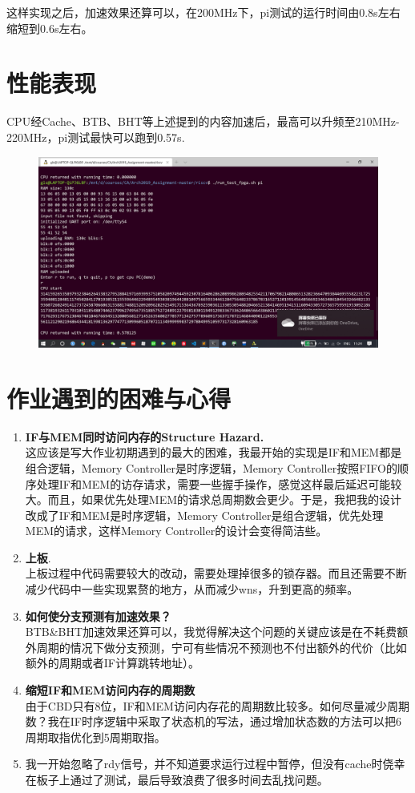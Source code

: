 \documentclass[a4paper,UTF8]{article}
\begin{document}
这样实现之后，加速效果还算可以，在200MHz下，pi测试的运行时间由0.8s左右缩短到0.6s左右。
\newpage
\section{性能表现}
CPU经Cache、BTB、BHT等上述提到的内容加速后，最高可以升频至210MHz-220MHz，pi测试最快可以跑到0.57s.
\begin{figure}[h]
    \centering
	\includegraphics[width=1\linewidth]{5.png}
\end{figure}

\section{作业遇到的困难与心得}
\begin{enumerate}
    \item \textbf{IF与MEM同时访问内存的Structure Hazard.}\\
        这应该是写大作业初期遇到的最大的困难，我最开始的实现是IF和MEM都是组合逻辑，Memory Controller是时序逻辑，Memory Controller按照FIFO的顺序处理IF和MEM的访存请求，需要一些握手操作，感觉这样最后延迟可能较大。而且，如果优先处理MEM的请求总周期数会更少。于是，我把我的设计改成了IF和MEM是时序逻辑，Memory Controller是组合逻辑，优先处理MEM的请求，这样Memory Controller的设计会变得简洁些。
    \item \textbf{上板}.\\
    上板过程中代码需要较大的改动，需要处理掉很多的锁存器。而且还需要不断减少代码中一些实现累赘的地方，从而减少wns，升到更高的频率。
    \item \textbf{如何使分支预测有加速效果？}\\
    BTB\&BHT加速效果还算可以，我觉得解决这个问题的关键应该是在不耗费额外周期的情况下做分支预测，宁可有些情况不预测也不付出额外的代价（比如额外的周期或者IF计算跳转地址）。
    \item \textbf{缩短IF和MEM访问内存的周期数}\\
    由于CBD只有8位，IF和MEM访问内存花的周期数比较多。如何尽量减少周期数？我在IF时序逻辑中采取了状态机的写法，通过增加状态数的方法可以把6周期取指优化到5周期取指。
    \item 我一开始忽略了rdy信号，并不知道要求运行过程中暂停，但没有cache时侥幸在板子上通过了测试，最后导致浪费了很多时间去乱找问题。
\end{enumerate}
\end{document}
